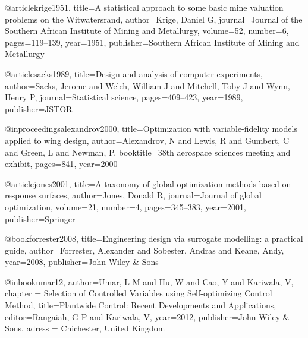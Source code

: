 @article{krige1951,
  title={A statistical approach to some basic mine valuation problems on the Witwatersrand},
  author={Krige, Daniel G},
  journal={Journal of the Southern African Institute of Mining and Metallurgy},
  volume={52},
  number={6},
  pages={119--139},
  year={1951},
  publisher={Southern African Institute of Mining and Metallurgy}
}

@article{sacks1989,
  title={Design and analysis of computer experiments},
  author={Sacks, Jerome and Welch, William J and Mitchell, Toby J and Wynn, Henry P},
  journal={Statistical science},
  pages={409--423},
  year={1989},
  publisher={JSTOR}
}

@inproceedings{alexandrov2000,
  title={Optimization with variable-fidelity models applied to wing design},
  author={Alexandrov, N and Lewis, R and Gumbert, C and Green, L and Newman, P},
  booktitle={38th aerospace sciences meeting and exhibit},
  pages={841},
  year={2000}
}

@article{jones2001,
  title={A taxonomy of global optimization methods based on response surfaces},
  author={Jones, Donald R},
  journal={Journal of global optimization},
  volume={21},
  number={4},
  pages={345--383},
  year={2001},
  publisher={Springer}
}

@book{forrester2008,
  title={Engineering design via surrogate modelling: a practical guide},
  author={Forrester, Alexander and Sobester, Andras and Keane, Andy},
  year={2008},
  publisher={John Wiley \& Sons}
}

@inbook{umar12,
  author={Umar, L M and Hu, W and Cao, Y and Kariwala, V},
  chapter = {Selection of Controlled Variables using Self-optimizing Control Method},
  title={Plantwide Control: Recent Developments and Applications},
  editor={Rangaiah, G P and Kariwala, V},
  year={2012},
  publisher={John Wiley \& Sons},
  adress = {Chichester, United Kingdom}
}

